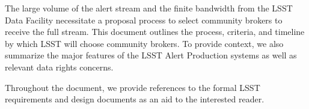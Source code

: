 The large volume of the alert stream and the finite bandwidth from the LSST Data Facility necessitate a proposal process to select community brokers to receive the full stream.
This document outlines the process, criteria, and timeline by which LSST will choose community brokers.
To provide context, we also summarize the major features of the LSST Alert Production systems as well as relevant data rights concerns.

Throughout the document, we provide references to the formal LSST requirements and design documents as an aid to the interested reader.
